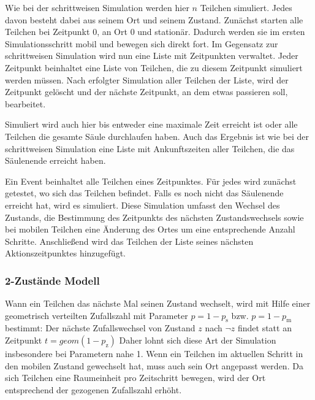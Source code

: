 Wie bei der schrittweisen Simulation werden hier $n$ Teilchen simuliert. Jedes davon besteht dabei aus seinem Ort und seinem Zustand. 
Zunächst starten alle Teilchen bei Zeitpunkt $0$, an Ort $0$ und stationär. Dadurch werden sie im ersten Simulationsschritt mobil und bewegen sich direkt fort. 
Im Gegensatz zur schrittweisen Simulation wird nun eine Liste mit Zeitpunkten verwaltet. Jeder Zeitpunkt beinhaltet eine Liste von Teilchen, die zu diesem Zeitpunkt simuliert werden müssen. Nach erfolgter Simulation aller Teilchen der Liste, wird der Zeitpunkt gelöscht und der nächste Zeitpunkt, an dem etwas passieren soll, bearbeitet.

Simuliert wird auch hier bis entweder eine maximale Zeit erreicht ist oder alle Teilchen die gesamte Säule durchlaufen haben. Auch das Ergebnis ist wie bei der schrittweisen Simulation eine Liste mit Ankunftszeiten aller Teilchen, die das Säulenende erreicht haben.


Ein Event beinhaltet alle Teilchen eines Zeitpunktes. Für jedes wird zunächst getestet, wo sich das Teilchen befindet. Falls es noch nicht das Säulenende erreicht hat, wird es simuliert. Diese Simulation umfasst den Wechsel des Zustands, die Bestimmung des Zeitpunkts des nächsten Zustandswechsels sowie bei mobilen Teilchen eine Änderung des Ortes um eine entsprechende Anzahl Schritte. Anschließend wird das Teilchen der Liste seines nächsten Aktionszeitpunktes hinzugefügt.

\subsubsection{2-Zustände Modell}

Wann ein Teilchen das nächste Mal seinen Zustand wechselt, wird mit Hilfe einer geometrisch verteilten Zufallszahl mit Parameter $p=1-p_\text{s}$ bzw. $p=1-p_\text{m}$ bestimmt: Der nächste Zufallswechsel von Zustand $z$ nach $\neg z$ findet statt an Zeitpunkt $t= geom(1-p_{\text{z}})$ %
Daher lohnt sich diese Art der Simulation insbesondere bei Parametern nahe 1. 
Wenn ein Teilchen im aktuellen Schritt in den mobilen Zustand gewechselt hat, muss auch sein Ort angepasst werden. Da sich Teilchen eine Raumeinheit pro Zeitschritt bewegen, wird der Ort entsprechend der gezogenen Zufallszahl erhöht.

